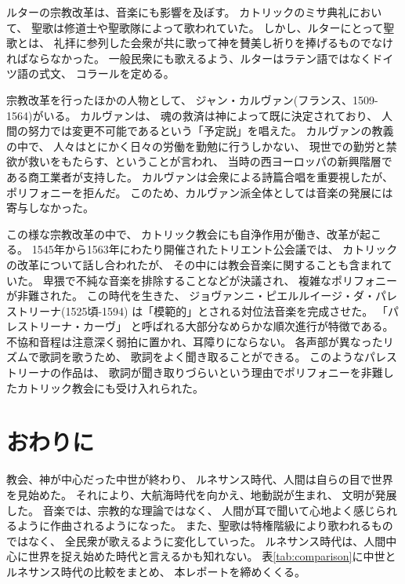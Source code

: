 \documentclass[a4j]{jarticle}
\begin{document}
ルターの宗教改革は、音楽にも影響を及ぼす。
カトリックのミサ典礼において、
聖歌は修道士や聖歌隊によって歌われていた。
しかし、ルターにとって聖歌とは、
礼拝に参列した会衆が共に歌って神を賛美し祈りを捧げるものでなければならなかった。
一般民衆にも歌えるよう、ルターはラテン語ではなくドイツ語の式文、
コラールを定める。

宗教改革を行ったほかの人物として、
ジャン・カルヴァン(フランス、1509-1564)がいる。
カルヴァンは、
魂の救済は神によって既に決定されており、
人間の努力では変更不可能であるという「予定説」を唱えた。
カルヴァンの教義の中で、
人々はとにかく日々の労働を勤勉に行うしかない、
現世での勤労と禁欲が救いをもたらす、ということが言われ、
当時の西ヨーロッパの新興階層である商工業者が支持した。
カルヴァンは会衆による詩篇合唱を重要視したが、
ポリフォニーを拒んだ。
このため、カルヴァン派全体としては音楽の発展には寄与しなかった。


この様な宗教改革の中で、
カトリック教会にも自浄作用が働き、改革が起こる。
1545年から1563年にわたり開催されたトリエント公会議では、
カトリックの改革について話し合われたが、
その中には教会音楽に関することも含まれていた。
卑猥で不純な音楽を排除することなどが決議され、
複雑なポリフォニーが非難された。
この時代を生きた、
ジョヴァンニ・ピエルルイージ・ダ・パレストリーナ(1525頃-1594)
は「模範的」とされる対位法音楽を完成させた。
「パレストリーナ・カーヴ」
と呼ばれる大部分なめらかな順次進行が特徴である。
不協和音程は注意深く弱拍に置かれ、耳障りにならない。
各声部が異なったリズムで歌詞を歌うため、
歌詞をよく聞き取ることができる。
このようなパレストリーナの作品は、
歌詞が聞き取りづらいという理由でポリフォニーを非難したカトリック教会にも受け入れられた。

\section{おわりに\label{sec:sum}}

教会、神が中心だった中世が終わり、
ルネサンス時代、人間は自らの目で世界を見始めた。
それにより、大航海時代を向かえ、地動説が生まれ、
文明が発展した。
音楽では、宗教的な理論ではなく、
人間が耳で聞いて心地よく感じられるように作曲されるようになった。
また、聖歌は特権階級により歌われるものではなく、
全民衆が歌えるように変化していった。
ルネサンス時代は、人間中心に世界を捉え始めた時代と言えるかも知れない。
表\ref{tab:comparison}に中世とルネサンス時代の比較をまとめ、
本レポートを締めくくる。
\end{document}
